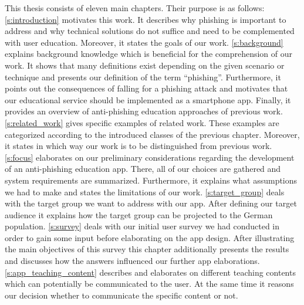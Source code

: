 This thesis consists of eleven main chapters.
Their purpose is as follows:
\newline
\newline
\autoref{s:introduction} motivates this work. It describes why phishing is important to address and why technical solutions do not suffice and need to be complemented with user education. Moreover, it states the goals of our work.
\newline
\newline
\autoref{s:background} explains background knowledge which is beneficial for the comprehension of our work. 
It shows that many definitions exist depending on the given scenario or technique and presents our definition of the term ``phishing''. Furthermore, it points out the consequences of falling for a phishing attack and motivates that our educational service should be implemented as a smartphone app.
Finally, it provides an overview of anti-phishing education approaches of previous work.
\newline
\newline
\autoref{s:related_work} gives specific examples of related work. These examples are categorized according to the introduced classes of the previous chapter. Moreover, it states in which way our work is to be distinguished from previous work. 
\newline
\newline
\autoref{s:focus} elaborates on our preliminary considerations regarding the development of an anti-phishing education app. 
There, all of our choices are gathered and system requirements are summarized.
Furthermore, it explains what assumptions we had to make and states the limitations of our work.
\newline
\newline
\autoref{s:target_group} deals with the target group we want to address with our app.
After defining our target audience it explains how the target group can be projected to the German population.
\newline
\newline
\autoref{s:survey} deals with our initial user survey we had conducted in order to gain some input before elaborating on the app design. After illustrating the main objectives of this survey this chapter additionally presents the results and discusses how the answers influenced our further app elaborations.
\newline
\newline
\autoref{s:app_teaching_content} describes and elaborates on different teaching contents which can potentially be communicated to the user. At the same time it reasons our decision whether to communicate the specific content or not.
